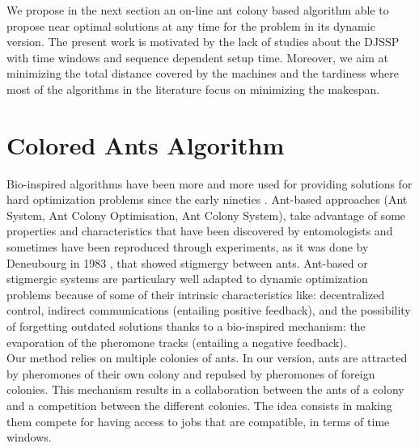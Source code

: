 \documentclass[a4paper,10pt]{article}
\begin{document}
We propose in the next section an on-line ant colony based algorithm able to propose near optimal solutions at any time for the problem in its dynamic version. The present work is motivated by the lack of studies about the DJSSP with time windows and sequence dependent setup time. Moreover, we aim at minimizing the total distance covered by the machines and the tardiness where  most of the algorithms in the literature focus on minimizing the makespan.

\section{Colored Ants Algorithm}\label{sec:ants}

Bio-inspired algorithms have been more and more used for providing solutions for hard optimization problems since the early nineties \cite{Dorigo2006}. Ant-based approaches (Ant System, Ant Colony Optimisation, Ant Colony System), take advantage of some properties and characteristics that have been discovered by entomologists and sometimes have been reproduced through experiments, as it was done by Deneubourg in 1983 \cite{Deneubourg1983}, that showed stigmergy between ants. Ant-based or stigmergic systems are particulary well adapted to dynamic optimization problems because of some of their intrinsic characteristics like: decentralized control, indirect communications (entailing positive feedback), and the possibility of forgetting outdated solutions thanks to a bio-inspired mechanism: the evaporation of the pheromone tracks (entailing a negative feedback).\\

Our method relies on multiple colonies of ants. In our version, ants are attracted by pheromones of their own colony and repulsed by pheromones of foreign colonies. This mechanism results in a collaboration between the ants of a colony and a competition between the different colonies. The idea consists in making them compete for having access to jobs that are compatible, in terms of time windows.\\
\end{document}

